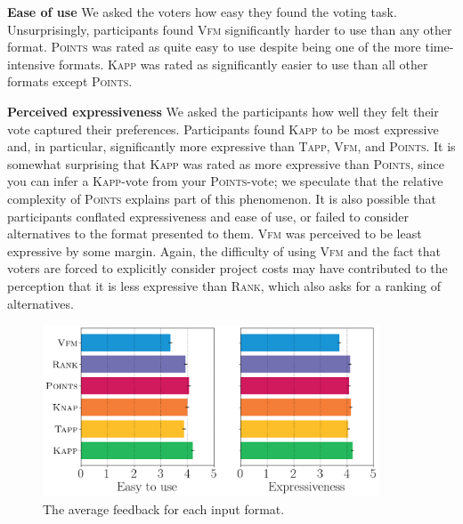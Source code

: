 \documentclass[runningheads]{llncs}
\newcommand{\points}{\textsc{Points}}
\newcommand{\rank}{\textsc{Rank}}
\newcommand{\vfm}{\textsc{Vfm}}
\newcommand{\kapp}{\textsc{Kapp}}
\newcommand{\tapp}{\textsc{Tapp}}
\begin{document}
\textbf{Ease of use}  We asked the voters how easy they found the voting task. Unsurprisingly, participants found \vfm{} significantly harder to use than any other format. \points{} was rated as quite easy to use despite being one of the more time-intensive formats. \kapp{} was rated as significantly easier to use than all other  formats except \points. 


\textbf{Perceived expressiveness} We asked the participants how well they felt their vote captured their preferences. 
Participants found \kapp{} to be most expressive and, in particular,  significantly more expressive than  \tapp, \vfm, and \points. It is somewhat surprising that \kapp{} was rated as more expressive than \points, since you can infer a \kapp-vote from  your \points-vote; we speculate that the relative complexity of  \points{} explains part of this phenomenon. It is also possible that participants conflated expressiveness and ease of use, or failed to consider alternatives to the format presented to them. %
\vfm{} was perceived to be least expressive by some margin. Again, the  difficulty of using \vfm{} and the fact that voters are forced to explicitly consider project costs may have contributed to the perception that it is less expressive than \rank, which also asks for a ranking of alternatives.  


\begin{figure}[!h]
\begin{center}
\includegraphics[width=10cm]{experiment/survey1.png}
\caption{The average feedback for each input format.
}\label{fig:feedback}
\end{center}
\end{figure}
\end{document}
